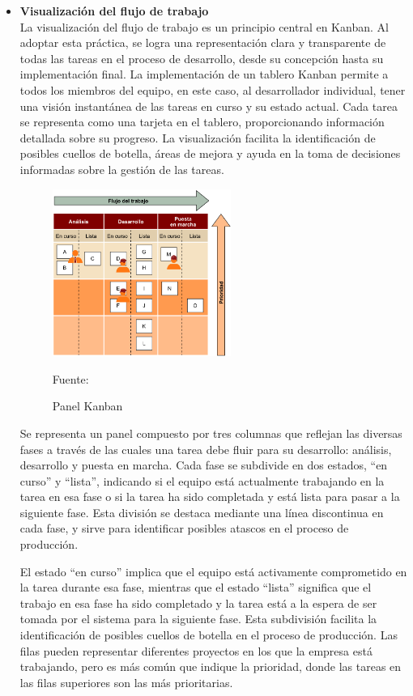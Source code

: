 \begin{itemize}
  \item \textbf{Visualización del flujo de trabajo} \\
  La visualización del flujo de trabajo es un principio central en Kanban. Al adoptar esta práctica, se logra una representación clara y transparente de todas las tareas en el proceso de desarrollo, desde su concepción hasta su implementación final. La implementación de un tablero Kanban permite a todos los miembros del equipo, en este caso, al desarrollador individual, tener una visión instantánea de las tareas en curso y su estado actual. Cada tarea se representa como una tarjeta en el tablero, proporcionando información detallada sobre su progreso. La visualización facilita la identificación de posibles cuellos de botella, áreas de mejora y ayuda en la toma de decisiones informadas sobre la gestión de las tareas. \parencite{Anderson2010}

  \begin{figure}[!h]
    \centering
    \includegraphics[width=0.55\textwidth]{images/kanban.png}
    \caption{Panel Kanban}
    \centering Fuente: \parencite{Bermejo2010}
    \label{fig:kanban}
  \end{figure}
  Se representa un panel compuesto por tres columnas que reflejan las diversas fases a través de las cuales una tarea debe fluir para su desarrollo: análisis, desarrollo y puesta en marcha. Cada fase se subdivide en dos estados, ``en curso'' y ``lista'', indicando si el equipo está actualmente trabajando en la tarea en esa fase o si la tarea ha sido completada y está lista para pasar a la siguiente fase. Esta división se destaca mediante una línea discontinua en cada fase, y sirve para identificar posibles atascos en el proceso de producción.
  
  El estado ``en curso'' implica que el equipo está activamente comprometido en la tarea durante esa fase, mientras que el estado ``lista'' significa que el trabajo en esa fase ha sido completado y la tarea está a la espera de ser tomada por el sistema para la siguiente fase. Esta subdivisión facilita la identificación de posibles cuellos de botella en el proceso de producción. Las filas pueden representar diferentes proyectos en los que la empresa está trabajando, pero es más común que indique la prioridad, donde las tareas en las filas superiores son las más prioritarias.
  

\end{itemize}
